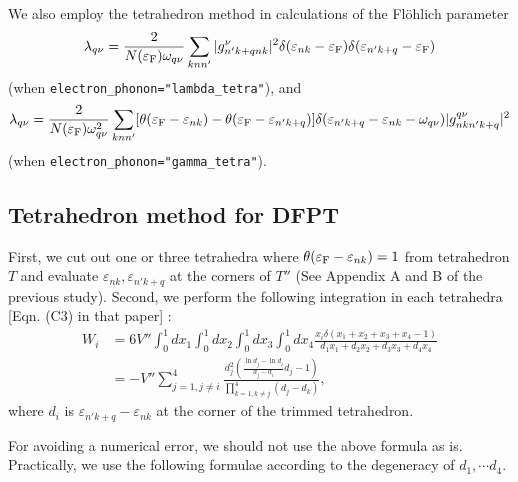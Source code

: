 \documentclass[12pt]{article}
\begin{document}
We also employ the tetrahedron method in
calculations of the Fl\"ohlich parameter
\begin{align}
  \label{fml_lambdaq}
  \lambda_{q \nu} = \frac{2}{N(\varepsilon_{\rm F}) \omega_{q \nu}} \sum_{k n n'}
  |g_{n' k + q n k}^{\nu}|^2 
  \delta(\varepsilon_{n k} - \varepsilon_{\rm F}) 
  \delta(\varepsilon_{n' k+q} - \varepsilon_{\rm F})
\end{align}
(when \verb|electron_phonon="lambda_tetra"|),
and
\begin{align}
  \lambda_{q \nu} = \frac{2}{N(\varepsilon_{\rm F}) \omega_{q \nu}^2} \sum_{k n n'}
        [\theta(\varepsilon_{\rm F}-\varepsilon_{n k})-\theta(\varepsilon_{\rm F} - \varepsilon_{n' k+q})]
        \delta(\varepsilon_{n' k+q} - \varepsilon_{n k} - \omega_{q \nu})  |g^{q \nu}_{n k n' k+q}|^2
  \label{fml_goldenrule}
\end{align}
(when \verb|electron_phonon="gamma_tetra"|).

\subsection{Tetrahedron method for DFPT}

First, we cut out one or three tetrahedra where
$\theta(\varepsilon_{\rm F} - \varepsilon_{n k})=1$ from tetrahedron $T$
and evaluate $\varepsilon_{n k},\varepsilon_{n' k+q}$ at the corners of $T''$
(See Appendix A and B of the previous study\cite{opt_tetra}).
Second, we perform the following integration in each tetrahedra [Eqn. (C3) in that paper] :
\begin{align}
  W_{i} &= 6 V'' \int_0^1 dx_1 \int^1_0 dx_2 \int_0^1 dx_3 \int_0^1 dx_4 
  \frac{x_i \delta(x_1+x_2+x_3+x_4-1)}{d_1 x_1 + d_2 x_2 + d_3 x_3 + d_4 x_4}
  \nonumber \\ 
  &= -V'' \sum_{j=1,j \ne i}^4
  \frac{d_j^2
    \left( \frac{\ln d_j - \ln d_i}{d_j - d_i} d_j - 1 \right)}
       {\prod_{k=1,k \ne j}^4 (d_j - d_k)},
\end{align}
where $d_i$ is $\varepsilon_{n' k+q} - \varepsilon_{n k}$ at the corner of the trimmed tetrahedron.

For avoiding a numerical error, we should not use the above formula as is.
Practically, we use the following formulae according to the degeneracy of $d_1, \cdots d_4$.
\end{document}
